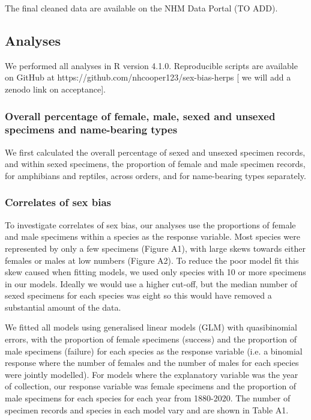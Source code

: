 \documentclass[a4paper, 12pt]{article}
\begin{document}
The final cleaned data are available on the NHM Data Portal (TO ADD). 

\subsection{Analyses}

We performed all analyses in R version 4.1.0\cite{R}. 
Reproducible scripts are available on GitHub at https://github.com/nhcooper123/sex-bias-herps [\cite{coopercode2022} we will add a zenodo link on acceptance].

\subsubsection{Overall percentage of female, male, sexed and unsexed specimens and name-bearing types}
We first calculated the overall percentage of sexed and unsexed specimen records, and within sexed specimens, the proportion of female and male specimen records, for amphibians and reptiles, across orders, and for name-bearing types separately. 

\subsubsection{Correlates of sex bias}
To investigate correlates of sex bias, our analyses use the proportions of female and male specimens within a species as the response variable. 
Most species were represented by only a few specimens (Figure A1), with large skews towards either females or males at low numbers (Figure A2). 
To reduce the poor model fit this skew caused when fitting models, we used only species with 10 or more specimens in our models. 
Ideally we would use a higher cut-off, but the median number of sexed specimens for each species was eight so this would have removed a substantial amount of the data. 

We fitted all models using generalised linear models (GLM) with quasibinomial errors, with the proportion of female specimens (success) and the proportion of male specimens (failure) for each species as the response variable (i.e. a binomial response where the number of females and the number of males for each species were jointly modelled). 
For models where the explanatory variable was the year of collection, our response variable was female specimens and the proportion of male specimens for each species for each year from 1880-2020. 
The number of specimen records and species in each model vary and are shown in Table A1.
\end{document}
